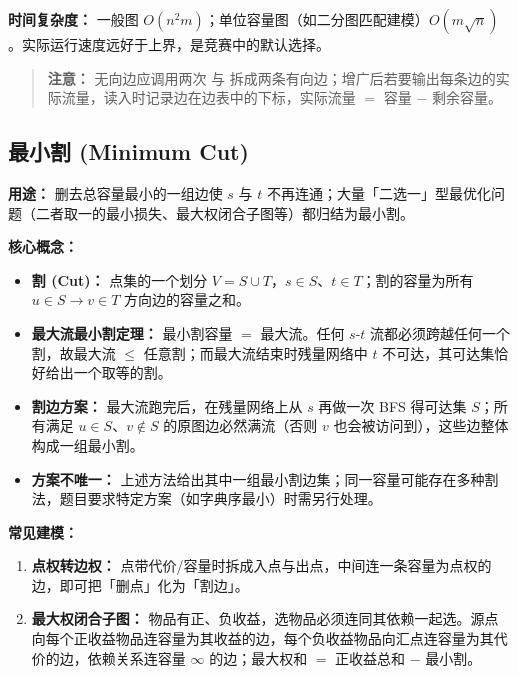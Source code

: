 \textbf{时间复杂度：} 一般图 $O(n^2 m)$；单位容量图（如二分图匹配建模）$O(m\sqrt{n})$。实际运行速度远好于上界，是竞赛中的默认选择。

\begin{quote}
\textbf{注意：} 无向边应调用两次  与  拆成两条有向边；增广后若要输出每条边的实际流量，读入时记录边在边表中的下标，实际流量 $=$ 容量 $-$ 剩余容量。
\end{quote}



\subsection{最小割 (Minimum Cut)}

\textbf{用途：} 删去总容量最小的一组边使 $s$ 与 $t$ 不再连通；大量「二选一」型最优化问题（二者取一的最小损失、最大权闭合子图等）都归结为最小割。

\textbf{核心概念：}
\begin{itemize}
  \item \textbf{割 (Cut)：} 点集的一个划分 $V = S \cup T$，$s \in S$、$t \in T$；割的容量为所有 $u \in S \to v \in T$ 方向边的容量之和。
  \item \textbf{最大流最小割定理：} 最小割容量 $=$ 最大流。任何 $s$-$t$ 流都必须跨越任何一个割，故最大流 $\le$ 任意割；而最大流结束时残量网络中 $t$ 不可达，其可达集恰好给出一个取等的割。
  \item \textbf{割边方案：} 最大流跑完后，在残量网络上从 $s$ 再做一次 BFS 得可达集 $S$；所有满足 $u \in S$、$v \notin S$ 的原图边必然满流（否则 $v$ 也会被访问到），这些边整体构成一组最小割。
  \item \textbf{方案不唯一：} 上述方法给出其中一组最小割边集；同一容量可能存在多种割法，题目要求特定方案（如字典序最小）时需另行处理。
\end{itemize}

\textbf{常见建模：}
\begin{enumerate}
  \item \textbf{点权转边权：} 点带代价/容量时拆成入点与出点，中间连一条容量为点权的边，即可把「删点」化为「割边」。
  \item \textbf{最大权闭合子图：} 物品有正、负收益，选物品必须连同其依赖一起选。源点向每个正收益物品连容量为其收益的边，每个负收益物品向汇点连容量为其代价的边，依赖关系连容量 $\infty$ 的边；最大权和 $=$ 正收益总和 $-$ 最小割。
\end{enumerate}

